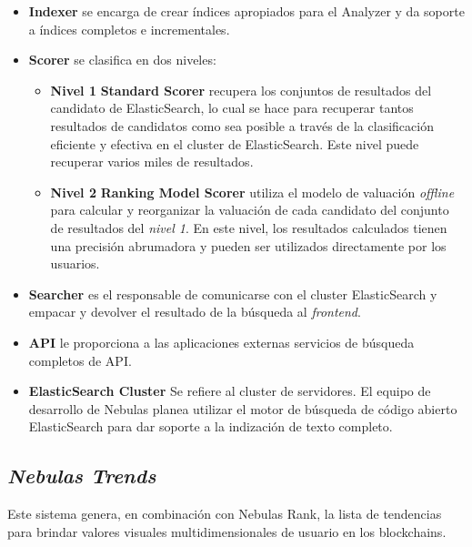 \begin{itemize}
	\item \textbf{Indexer} se encarga de crear índices apropiados para el Analyzer y da soporte a índices completos e incrementales.

	\item \textbf{Scorer} se clasifica en dos niveles:
	\begin{itemize}
		\item \textbf{Nivel 1} \textbf{Standard Scorer} recupera los conjuntos de resultados del candidato de ElasticSearch, lo cual se hace para recuperar tantos resultados de candidatos como sea posible a través de la clasificación eficiente y efectiva en el cluster de ElasticSearch. Este nivel puede recuperar varios miles de resultados.
		\item \textbf{Nivel 2} \textbf{Ranking Model Scorer} utiliza el modelo de valuación \textit{offline} para calcular y reorganizar la valuación de cada candidato del conjunto de resultados del \textit{nivel 1}. En este nivel, los resultados calculados tienen una precisión abrumadora y pueden ser utilizados directamente por los usuarios.
	\end{itemize}
	\item \textbf{Searcher} es el responsable de comunicarse con el cluster ElasticSearch y empacar y devolver el resultado de la búsqueda al \textit{frontend}.

	\item \textbf{API} le proporciona a las aplicaciones externas servicios de búsqueda completos de API.

	\item \textbf{ElasticSearch Cluster} Se refiere al cluster de servidores. El equipo de desarrollo de Nebulas planea utilizar el motor de búsqueda de código abierto ElasticSearch para dar soporte a la indización de texto completo.

\end{itemize}

\subsection{\textit{Nebulas Trends}}

Este sistema genera, en combinación con Nebulas Rank, la lista de tendencias para brindar valores visuales multidimensionales de usuario en los blockchains.

